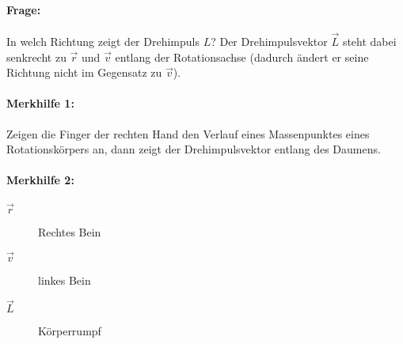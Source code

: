 	\paragraph{Frage:}
	In welch Richtung zeigt der Drehimpuls $ L $?
	Der Drehimpulsvektor $ \vec{L} $ steht dabei senkrecht zu $ \vec{r} $ und $ \vec{v} $ entlang der Rotationsachse (dadurch ändert er seine Richtung nicht im Gegensatz zu $ \vec{v} $).
	\paragraph{Merkhilfe 1:}
	Zeigen die Finger der rechten Hand den Verlauf eines Massenpunktes eines Rotationskörpers an, dann zeigt der Drehimpulsvektor entlang des Daumens.
	\paragraph{Merkhilfe 2:}
	\begin{description}
		\item[$ \vec{r} $] Rechtes Bein
		\item[$ \vec{v} $] linkes Bein
		\item[$ \vec{L} $] Körperrumpf
	\end{description}














